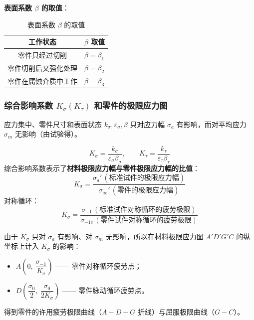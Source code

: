 \textbf{表面系数 $\beta$ 的取值}：

\begin{table}[H]
\centering
\caption{表面系数 $\beta$ 的取值}
\label{tab:强度:表面系数}
\begin{tabular}{cl}
	\toprule
	工作状态 & $\beta$ 取值 \\
	\midrule
	零件只经过切削 & $\beta=\beta_1$ \\
	零件切削后又强化处理 & $\beta=\beta_2$ \\
	零件在腐蚀介质中工作 & $\beta=\beta_3$ \\
	\bottomrule
\end{tabular}
\end{table}

\subsubsection{综合影响系数 $K_\sigma(K_\tau)$ 和零件的极限应力图}

应力集中、零件尺寸和表面状态 $k_\sigma,\varepsilon_\sigma,\beta$ 只对应力幅 $\sigma_a$ 有影响，而对平均应力 $\sigma_m$ 无影响（由试验得）。

\begin{theorem}[综合影响系数]
\label{thm:综合影响系数}
\begin{equation}
	K_\sigma=\frac{k_\sigma}{\varepsilon_\sigma\beta_\sigma},\qquad K_\tau=\frac{k_\tau}{\varepsilon_\tau\beta_\tau}
	\label{eq:强度:综合影响系数}
\end{equation}
综合影响系数表示了\textbf{材料极限应力幅与零件极限应力幅的比值}：
\begin{equation}
	K_\sigma=\frac{\sigma_a'\,(\text{标准试件的极限应力幅})}{\sigma_{ae}'\,(\text{零件的极限应力幅})}
	\label{eq:强度:综合影响系数比值1}
\end{equation}
对称循环：
\begin{equation}
	K_\sigma=\frac{\sigma_{-1}\,(\text{标准试件对称循环的疲劳极限})}{\sigma_{-1e}\,(\text{零件试件对称循环的疲劳极限})}
	\label{eq:强度:综合影响系数比值2}
\end{equation}
\end{theorem}

\begin{definition}[零件的极限应力图]
\label{def:零件的极限应力图}
由于 $K_\sigma$ 只对 $\sigma_a$ 有影响、对 $\sigma_m$ 无影响，所以在材料极限应力图 $A'D'G'C$ 的纵坐标上计入 $K_\sigma$ 的影响：
\begin{itemize}
	\item $A\left(0,\ \dfrac{\sigma_{-1}}{K_\sigma}\right)$ —— 零件对称循环疲劳点；
	\item $D\left(\dfrac{\sigma_0}{2},\ \dfrac{\sigma_0}{2K_\sigma}\right)$ —— 零件脉动循环疲劳点。
\end{itemize}
得到零件的许用疲劳极限曲线（$A\!-\!D\!-\!G$ 折线）与屈服极限曲线（$G\!-\!C$）。
\end{definition}

